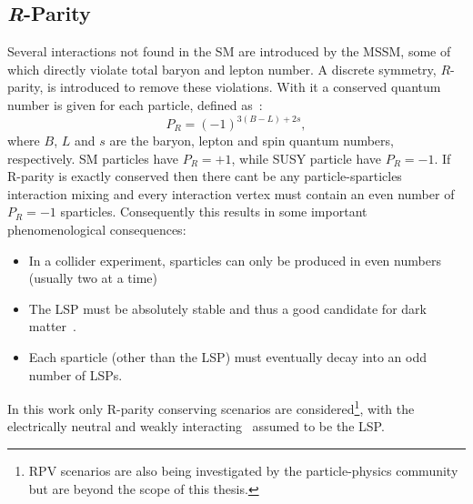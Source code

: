 	\subsection{\textit{R}-Parity}
	Several interactions not found in the \ac{SM} are introduced by the \ac{MSSM}, some of which directly violate total baryon and lepton number.
	A discrete symmetry, $R$-parity, is introduced to remove these violations. With it a conserved quantum number is given for each particle, defined as~\cite{susyprimer}:
	\begin{equation}
	P_R=(-1)^{3(B-L)+2s},
	\end{equation}
	where $B$, $L$ and $s$ are the baryon, lepton and spin quantum numbers, respectively.
	\ac{SM} particles have $P_R=+1$, while \ac{SUSY} particle have $P_R=-1$. 
	If R-parity is exactly conserved  then there cant be any particle-sparticles interaction mixing and every interaction vertex must contain an even number of $P_R=-1$ sparticles.
	Consequently this results in some important phenomenological consequences:
	\begin{itemize}
	\item In a collider experiment, sparticles can only be produced in even numbers (usually two at a time)
	\item The \ac{LSP} must be absolutely stable and thus a good candidate for dark matter~\cite{ELLIS1984453}. 
	\item Each sparticle (other than the \ac{LSP}) must eventually decay into an odd number of \acp{LSP}.
\end{itemize}	
	
	In this work only R-parity conserving scenarios are considered\footnote{\ac{RPV} scenarios are also being investigated by the particle-physics community but are beyond the scope of this thesis.}, with the electrically neutral and weakly interacting \ninoone\ assumed to be the \ac{LSP}.
	
